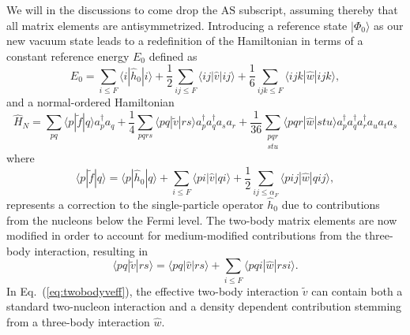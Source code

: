 \documentclass[preprint,12pt,authoryear]{elsarticle}
\begin{document}
We will in the discussions to come drop the $\mathrm{AS}$ subscript,
assuming thereby that all matrix elements are antisymmetrized.
Introducing a reference state $|\Phi_0\rangle$ as our new vacuum state
leads to a redefinition of the Hamiltonian in terms of a constant
reference energy $E_0$ defined as
\[
E_0 = \sum_{i\le F}\langle i | \hat{h}_0|i\rangle+\frac{1}{2}\sum_{ij\le F} \langle ij|\hat{v}|ij\rangle +\frac{1}{6}\sum_{ijk\le F} \langle ijk|\hat{w}|ijk\rangle,
\]
and a normal-ordered Hamiltonian 
\[
  \hat{H}_N=\sum_{pq}\langle p|\tilde{f}|q\rangle a^\dagger_p a_q+\frac{1}{4} \sum_{pqrs} \langle pq|\tilde{v}|rs\rangle a^\dagger_p a^\dagger_q a_s  a_r +\frac{1}{36} \sum_{\substack{pqr \\stu}}
                 \langle pqr|\hat{w}|stu\rangle a^\dagger_p a^\dagger_q a^\dagger_r a_u a_t a_s 
\]
where
\[
\langle p| \tilde{f}|q\rangle = \langle p|\hat{h}_0|q\rangle +\sum_{i\le F} \langle pi|\hat{v}|qi\rangle+\frac{1}{2}\sum_{ij\le\alpha_F} \langle pij|\hat{w}|qij\rangle,
\] 
represents a correction to the single-particle operator $\hat{h}_0$ due to contributions from the nucleons below the Fermi level.
The two-body matrix elements are now modified in order to account for medium-modified contributions from the three-body interaction, resulting in
\begin{equation}
\langle pq|\tilde{v}|rs\rangle=\langle pq|\hat{v}|rs\rangle+\sum_{i\le F} \langle pqi|\hat{w}|rsi\rangle.
\label{eq:twobodyveff}
\end{equation}
In Eq.~(\ref{eq:twobodyveff}), the effective two-body interaction
$\tilde{v}$ can contain both a standard two-nucleon interaction and a
density dependent contribution stemming from a three-body interaction
$\hat{w}$.
\end{document}
